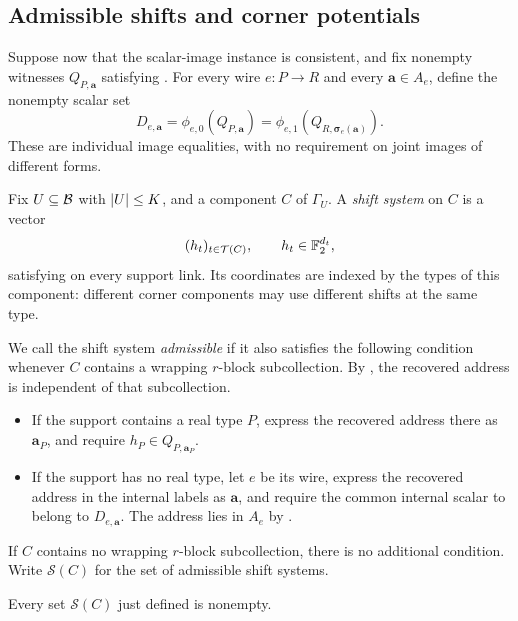 \subsection{Admissible shifts and corner potentials}
\label{offset:shifts}

Suppose now that the scalar-image instance is consistent, and fix
nonempty witnesses \(Q_{P,\mathbf a}\) satisfying
. For every wire \(e:P\to R\) and every
\(\mathbf a\in A_e\), define the nonempty scalar set
\begin{equation}
 D_{e,\mathbf a}
   =\phi_{e,0}(Q_{P,\mathbf a})
   =\phi_{e,1}
       (Q_{R,\boldsymbol\sigma_e(\mathbf a)}).
 \label{offset:eq-wire-images}
\end{equation}
These are individual image equalities, with no requirement on joint
images of different forms.

Fix \(U\subseteq\mathcal B\) with \(\lvert U\rvert\le K\), and a component \(C\) of
\(\Gamma_U\). A \emph{shift system} on \(C\) is a vector
\[
 (h_t)_{t\in\mathcal T(C)},\qquad h_t\in\mathbb F_2^{d_t},
\]
satisfying  on every support link. Its coordinates
are indexed by the types of this component: different corner components
may use different shifts at the same type.

We call the shift system \emph{admissible} if it also satisfies the
following condition whenever \(C\) contains a wrapping \(r\)-block
subcollection. By , the recovered address is
independent of that subcollection.
\begin{itemize}
 \item If the support contains a real type \(P\), express the recovered
 address there as \(\mathbf a_P\), and require
 \(h_P\in Q_{P,\mathbf a_P}\).
 \item If the support has no real type, let \(e\) be its wire, express the
 recovered address in the internal labels as \(\mathbf a\), and require
 the common internal scalar to belong to \(D_{e,\mathbf a}\).
 The address lies in \(A_e\) by .
\end{itemize}
If \(C\) contains no wrapping \(r\)-block subcollection, there is no
additional condition. Write \(\mathcal S(C)\) for the set of admissible
shift systems.

\begin{lemma}
\label{offset:lem-shifts-exist}
Every set \(\mathcal S(C)\) just defined is nonempty.
\end{lemma}

